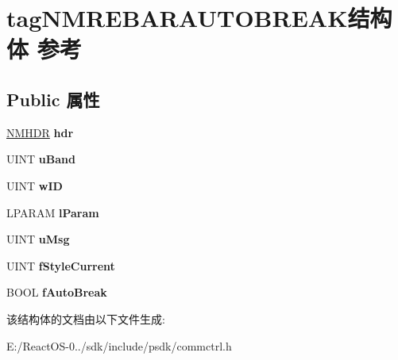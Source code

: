 \hypertarget{structtag_n_m_r_e_b_a_r_a_u_t_o_b_r_e_a_k}{}\section{tag\+N\+M\+R\+E\+B\+A\+R\+A\+U\+T\+O\+B\+R\+E\+A\+K结构体 参考}
\label{structtag_n_m_r_e_b_a_r_a_u_t_o_b_r_e_a_k}
\subsection*{Public 属性}
\begin{DoxyCompactItemize}
\item 
\mbox{\label{structtag_n_m_r_e_b_a_r_a_u_t_o_b_r_e_a_k_a74ea51c65c065d252473e490d0ddc71e}} 
\hyperlink{structtag_n_m_h_d_r}{N\+M\+H\+DR} {\bfseries hdr}
\item 
\mbox{\label{structtag_n_m_r_e_b_a_r_a_u_t_o_b_r_e_a_k_a5c521f432a1d92f30846c4586e6fb290}} 
U\+I\+NT {\bfseries u\+Band}
\item 
\mbox{\label{structtag_n_m_r_e_b_a_r_a_u_t_o_b_r_e_a_k_aa4c3f04de5679070e600a34ec6f5e246}} 
U\+I\+NT {\bfseries w\+ID}
\item 
\mbox{\label{structtag_n_m_r_e_b_a_r_a_u_t_o_b_r_e_a_k_ac094046e02a51c5d7b5eae87dedb0c56}} 
L\+P\+A\+R\+AM {\bfseries l\+Param}
\item 
\mbox{\label{structtag_n_m_r_e_b_a_r_a_u_t_o_b_r_e_a_k_a16585ff1719ff571cc882a1e0c4b1480}} 
U\+I\+NT {\bfseries u\+Msg}
\item 
\mbox{\label{structtag_n_m_r_e_b_a_r_a_u_t_o_b_r_e_a_k_ad80af2ab11b05650f85d7385e2a8bd06}} 
U\+I\+NT {\bfseries f\+Style\+Current}
\item 
\mbox{\label{structtag_n_m_r_e_b_a_r_a_u_t_o_b_r_e_a_k_ab9f55ae9d2792a174ab1945a895c48d1}} 
B\+O\+OL {\bfseries f\+Auto\+Break}
\end{DoxyCompactItemize}


该结构体的文档由以下文件生成\+:\begin{DoxyCompactItemize}
\item 
E\+:/\+React\+O\+S-\/0../sdk/include/psdk/commctrl.\+h\end{DoxyCompactItemize}
